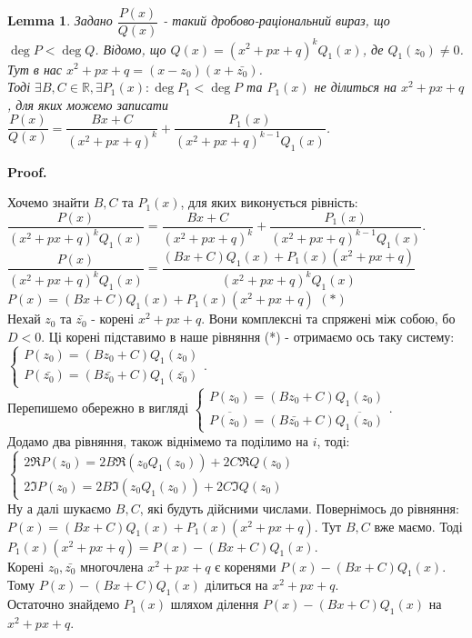 \documentclass[a4paper, 10pt]{extarticle}
\makeatletter
\def\qed{$\blacksquare$}
\def\qed{$\blacksquare$}
\theoremstyle{theoremdd}
\theoremstyle{theoremdd}
\theoremstyle{theoremdd}
\theoremstyle{theoremdd}
\theoremstyle{theoremdd}
\theoremstyle{theoremdd}
\theoremstyle{theoremdd}
\newtheorem{lemma}[theorem]{Lemma}
\theoremstyle{theoremdd}
\renewenvironment{proof}[1][Proof.\\]{\par
\pushQED{\hfill \qed}%
\normalfont \topsep6\p@\@plus6\p@\relax
\trivlist
\item\relax
{\bfseries
#1\@addpunct{.}}\hspace\labelsep\ignorespaces
}{%
\popQED\endtrivlist\@endpefalse
}
\makeatother
\begin{document}
\begin{lemma}
Задано $\dfrac{P(x)}{Q(x)}$ - такий дробово-раціональний вираз, що $\deg P < \deg Q$. Відомо, що $Q(x) = (x^2+px+q)^kQ_1(x)$, де $Q_1(z_0) \neq 0$. Тут в нас $x^2+px+q = (x-z_0)(x+\bar{z_0})$.\\
Тоді $\exists B,C \in \mathbb{R}, \exists P_1(x): \deg P_1 < \deg P$ та $P_1(x)$ не ділиться на $x^2+px+q$, для яких можемо записати\\
$\dfrac{P(x)}{Q(x)} = \dfrac{Bx+C}{(x^2+px+q)^k} + \dfrac{P_1(x)}{(x^2+px+q)^{k-1}Q_1(x)}$.
\end{lemma}

\begin{proof}
Хочемо знайти $B,C$ та $P_1(x)$, для яких виконується рівність:\\
$\dfrac{P(x)}{(x^2+px+q)^k Q_1(x)} = \dfrac{Bx+C}{(x^2+px+q)^k} + \dfrac{P_1(x)}{(x^2+px+q)^{k-1}Q_1(x)}$.\\
$\dfrac{P(x)}{(x^2+px+q)^k Q_1(x)} = \dfrac{(Bx+C)Q_1(x)+P_1(x)(x^2+px+q)}{(x^2+px+q)^k Q_1(x)}$\\
$P(x) = (Bx+C)Q_1(x)+P_1(x)(x^2+px+q)$ $(*)$\\
Нехай $z_0$ та $\bar{z_0}$ - корені $x^2+px+q$. Вони комплексні та спряжені між собою, бо $D < 0$. Ці корені підставимо в наше рівняння (*) - отримаємо ось таку систему:
$\begin{cases} 
P(z_0) = (Bz_0+C)Q_1(z_0) \\
P(\bar{z_0}) = (B\bar{z_0}+C) Q_1(\bar{z_0})
\end{cases}$.\\
Перепишемо обережно в вигляді $\begin{cases} 
P(z_0) = (Bz_0+C)Q_1(z_0) \\
\overline{P(z_0)} = (B\bar{z_0}+C) \overline{Q_1(z_0)}
\end{cases}$.\\
Додамо два рівняння, також віднімемо та поділимо на $i$, тоді:\\
$\begin{cases}
2 \Re P(z_0) = 2B \Re (z_0 Q_1(z_0)) + 2C \Re Q(z_0) \\
2 \Im P(z_0) = 2B \Im(z_0 Q_1(z_0)) + 2C \Im Q(z_0)
\end{cases}
$\\
Ну а далі шукаємо $B,C$, які будуть дійсними числами. Повернімось до рівняння:\\
$P(x) = (Bx+C)Q_1(x) + P_1(x)(x^2+px+q)$. Тут $B,C$ вже маємо. Тоді\\
$P_1(x)(x^2+px+q) = P(x) - (Bx+C)Q_1(x)$.\\
Корені $z_0, \bar{z_0}$ многочлена $x^2+px+q$ є коренями $P(x)-(Bx+C)Q_1(x)$. Тому $P(x) - (Bx+C)Q_1(x)$ ділиться на $x^2+px+q$.\\
Остаточно знайдемо $P_1(x)$ шляхом ділення $P(x) - (Bx+C)Q_1(x)$ на $x^2+px+q$.
\end{proof}
\end{document}

